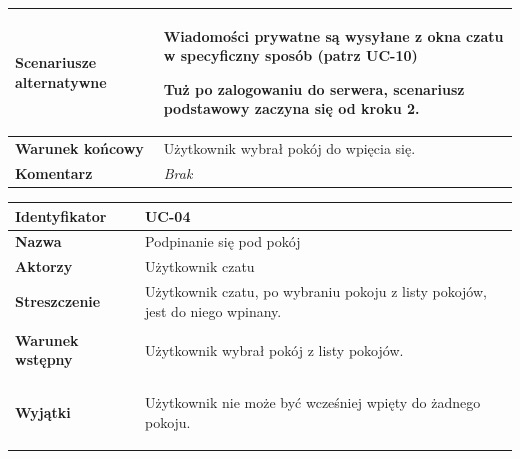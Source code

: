 {\begin{tabularx}{\textwidth}{|l|X|}
	\hline
		\textbf{Scenariusze alternatywne} &
			\begin{enumreq}
				\item Wiadomości prywatne są wysyłane z okna czatu w
				specyficzny sposób (patrz UC-10)
				\item Tuż po zalogowaniu do serwera, scenariusz podstawowy zaczyna się
				od kroku 2.
			\end{enumreq}
		\\

	\hline
		\textbf{Warunek końcowy} &
			Użytkownik wybrał pokój do wpięcia się.
		\\

	\hline
		\textbf{Komentarz} &
			\textit{Brak}
		\\

	\hline
\end{tabularx}

\vspace{2em}

\begin{tabular}{ | l | l | }
	\hline
		\textbf{Identyfikator} &
		UC-04
		\\

	\hline
		\textbf{Nazwa} &
		Podpinanie się pod pokój
		\\

	\hline
		\textbf{Aktorzy} & \parbox[t]{11cm}{
			Użytkownik czatu
		}\\

	\hline
		\textbf{Streszczenie} & \parbox[t]{11cm}{
			Użytkownik czatu, po wybraniu pokoju z listy pokojów, jest
			do niego wpinany.

		}\\

	\hline
		\textbf{Warunek wstępny} & \parbox[t]{11cm}{
			\begin{enumreq}
				\item Użytkownik wybrał pokój z listy pokojów.
			\end{enumreq}

		}
		\\

	\hline
		\textbf{Wyjątki} & \parbox[t]{11cm}{
			\begin{enumreq}
				\item Użytkownik nie może być wcześniej wpięty do żadnego pokoju.
			\end{enumreq}

		}
		\\


\end{tabular}}

